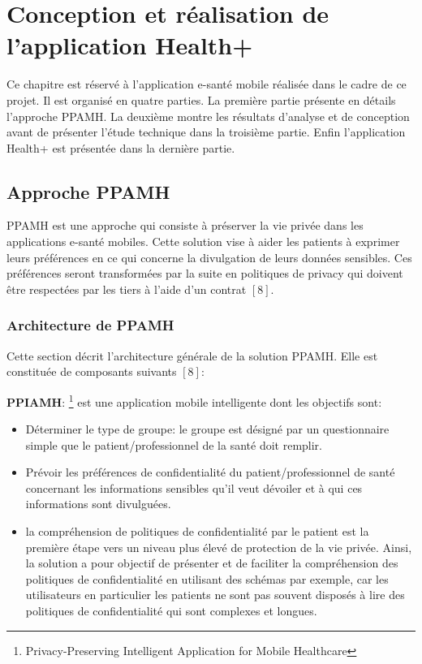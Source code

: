 \chapter{Conception et réalisation de l'application Health+}

Ce chapitre est réservé à l'application e-santé mobile réalisée dans le cadre de ce projet. Il est organisé en quatre parties. La première partie présente en détails l'approche PPAMH. La deuxième montre les résultats d'analyse et de conception avant de présenter l'étude technique dans la troisième partie. Enfin l'application Health+ est présentée dans la dernière partie.

\section{Approche PPAMH}

PPAMH est une approche qui consiste à préserver la vie privée dans les applications e-santé mobiles. Cette solution vise à aider les patients à exprimer leurs préférences en ce qui concerne la divulgation de leurs données sensibles. Ces préférences seront transformées par la suite en politiques de privacy qui doivent être respectées par les tiers à l'aide d'un contrat $[8]$.

\subsection{Architecture de PPAMH}

Cette section décrit l'architecture générale de la solution PPAMH. Elle est constituée de composants suivants $[8]$:

\vspace{6pt}
\paragraphmark

\textbf{PPIAMH}: \footnote{Privacy-Preserving Intelligent Application for Mobile Healthcare} est une application mobile intelligente dont les objectifs sont:

\vspace{6pt}
\paragraphmark

\begin{itemize}
	\item Déterminer le type de groupe: le groupe est désigné par un questionnaire simple que le patient/professionnel de la santé doit remplir.
	\item Prévoir les préférences de confidentialité du patient/professionnel de santé concernant les informations sensibles qu'il veut dévoiler et à qui ces informations sont divulguées.
	\item la compréhension de politiques de confidentialité par le patient est la première étape vers un niveau plus élevé de protection de la vie privée. Ainsi, la solution a pour objectif de présenter et de faciliter la compréhension des politiques de confidentialité en utilisant des schémas par exemple, car les utilisateurs en particulier les patients ne sont pas souvent disposés à lire des politiques de confidentialité qui sont complexes et longues.
\end{itemize}

